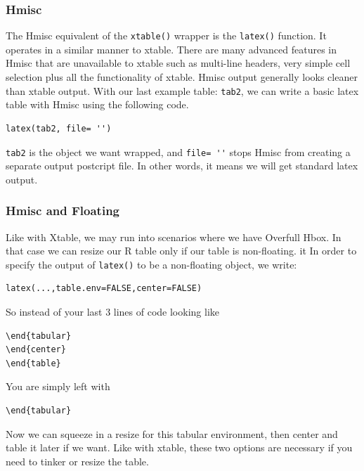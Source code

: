 \documentclass[nogin]{beamer}\usepackage[]{graphicx}\usepackage[]{color}
\begin{document}
\begin{frame}[fragile]
\frametitle{Hmisc}
The Hmisc equivalent of the \verb|xtable()| wrapper  is the \verb|latex()| function. It operates in a similar manner to xtable. There are many advanced features in Hmisc that are unavailable to xtable such as multi-line headers, very simple cell selection plus all the functionality of xtable. Hmisc output generally looks cleaner than xtable output.
With our last example table:  \verb|tab2|, we can write a basic latex table with Hmisc using the following code.
\begin{verbatim}
latex(tab2, file= '')
\end{verbatim}
\verb|tab2| is the object we want wrapped, and \verb|file= ''| stops Hmisc from creating a separate output postcript file. In other words, it means we will get standard latex output.
\end{frame}

\begin{frame}[fragile]
\frametitle{Hmisc and Floating}
\small
Like with Xtable, we may run into scenarios where we have Overfull Hbox. In that case we can resize our R table only if our table is non-floating. it In order to specify the output of \verb|latex()| to be a non-floating object, we write:
\begin{verbatim}
latex(...,table.env=FALSE,center=FALSE)
\end{verbatim}
So instead of your last 3 lines of code looking like
\begin{verbatim}
\end{tabular}
\end{center}
\end{table}
\end{verbatim}
You are simply left with
\begin{verbatim}
\end{tabular}
\end{verbatim}
Now we can squeeze in a resize for this tabular environment, then center and table it later if we want.
Like with xtable, these two options are necessary if you need to tinker or resize the table.
\end{frame}
\end{document}

